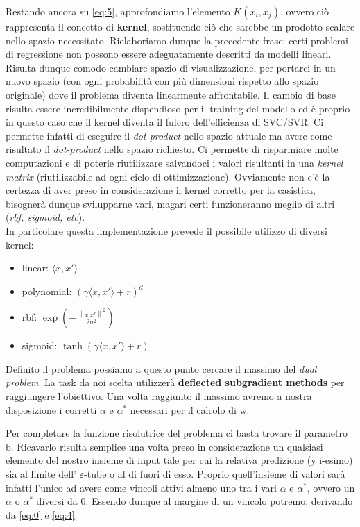\documentclass[12pt]{article}
\newcommand{\norm}[1]{\left\lVert#1\right\rVert}
\begin{document}

	Restando ancora su \eqref{eq:5}, approfondiamo l'elemento $K(x_i,x_j)$, ovvero ciò rappresenta il concetto di \textbf{kernel}, sostituendo ciò che sarebbe un prodotto scalare nello spazio necessitato. Rielaboriamo dunque la precedente frase: certi problemi di regressione non possono essere adeguatamente descritti da modelli lineari. Risulta dunque comodo cambiare spazio di visualizzazione, per portarci in un nuovo spazio (con ogni probabilità con più dimensioni rispetto allo spazio originale) dove il problema diventa linearmente affrontabile. Il cambio di base risulta essere incredibilmente dispendioso per il training del modello ed è proprio in questo caso che il kernel diventa il fulcro dell’efficienza di SVC/SVR. Ci permette infatti di eseguire il \textit{dot-product} nello spazio attuale ma avere come risultato il \textit{dot-product} nello spazio richiesto. Ci permette di risparmiare molte computazioni e di poterle riutilizzare salvandoci i valori risultanti in una \textit{kernel matrix} (riutilizzabile ad ogni ciclo di ottimizzazione). Ovviamente non c’è la certezza di aver preso in considerazione il kernel corretto per la casistica, bisognerà dunque svilupparne vari, magari certi funzioneranno meglio di altri (\textit{rbf, sigmoid, etc}).\\
In particolare questa implementazione prevede il possibile utilizzo di diversi kernel:\\
	\begin{itemize}
		\item linear: $\langle x,x' \rangle$
		\item polynomial: $(\gamma\langle x,x' \rangle + r)^d$
		\item rbf: $\exp(-\frac{\norm{x \  x'}^2}{2\sigma^2})$
		\item sigmoid: $\tanh(\gamma\langle x,x' \rangle + r)$
	\end{itemize}

	Definito il problema possiamo a questo punto cercare il massimo del \textit{dual problem}. La task da noi scelta utilizzerà \textbf{deflected subgradient methods} per raggiungere l’obiettivo. Una volta raggiunto il massimo avremo a nostra disposizione i corretti $\alpha$ e $\alpha^*$ necessari per il calcolo di w. 

	Per completare la funzione risolutrice del problema ci basta trovare il parametro b. Ricavarlo risulta semplice una volta preso in considerazione un qualsiasi elemento del nostro insieme di input tale per cui la relativa predizione (y i-esimo) sia al limite dell’ $\varepsilon$-tube o al di fuori di esso. Proprio quell’insieme di valori sarà infatti l’unico ad avere come vincoli attivi almeno uno tra i vari $\alpha$ e $\alpha^*$, ovvero un $\alpha$ o $\alpha^*$ diversi da 0. Essendo dunque al margine di un vincolo potremo, derivando da \eqref{eq:0} e \eqref{eq:4}:
\end{document}
